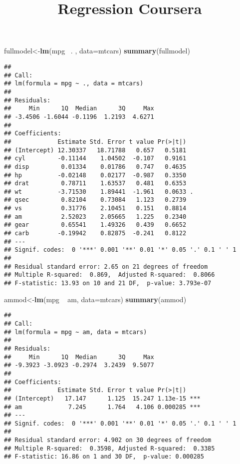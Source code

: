\documentclass[]{article}
\title{Regression Coursera}
\author{}
\date{}
\newenvironment{Shaded}{\begin{snugshade}}{\end{snugshade}}
\newcommand{\KeywordTok}[1]{\textcolor[rgb]{0.13,0.29,0.53}{\textbf{{#1}}}}
\newcommand{\DataTypeTok}[1]{\textcolor[rgb]{0.13,0.29,0.53}{{#1}}}
\newcommand{\StringTok}[1]{\textcolor[rgb]{0.31,0.60,0.02}{{#1}}}
\newcommand{\NormalTok}[1]{{#1}}
\begin{document}
\maketitle

\begin{Shaded}
\begin{Highlighting}[]
\NormalTok{fullmodel<-}\KeywordTok{lm}\NormalTok{(mpg~}\StringTok{ }\NormalTok{. , }\DataTypeTok{data=}\NormalTok{mtcars)}
\KeywordTok{summary}\NormalTok{(fullmodel)}
\end{Highlighting}
\end{Shaded}

\begin{verbatim}
## 
## Call:
## lm(formula = mpg ~ ., data = mtcars)
## 
## Residuals:
##     Min      1Q  Median      3Q     Max 
## -3.4506 -1.6044 -0.1196  1.2193  4.6271 
## 
## Coefficients:
##             Estimate Std. Error t value Pr(>|t|)  
## (Intercept) 12.30337   18.71788   0.657   0.5181  
## cyl         -0.11144    1.04502  -0.107   0.9161  
## disp         0.01334    0.01786   0.747   0.4635  
## hp          -0.02148    0.02177  -0.987   0.3350  
## drat         0.78711    1.63537   0.481   0.6353  
## wt          -3.71530    1.89441  -1.961   0.0633 .
## qsec         0.82104    0.73084   1.123   0.2739  
## vs           0.31776    2.10451   0.151   0.8814  
## am           2.52023    2.05665   1.225   0.2340  
## gear         0.65541    1.49326   0.439   0.6652  
## carb        -0.19942    0.82875  -0.241   0.8122  
## ---
## Signif. codes:  0 '***' 0.001 '**' 0.01 '*' 0.05 '.' 0.1 ' ' 1
## 
## Residual standard error: 2.65 on 21 degrees of freedom
## Multiple R-squared:  0.869,  Adjusted R-squared:  0.8066 
## F-statistic: 13.93 on 10 and 21 DF,  p-value: 3.793e-07
\end{verbatim}

\begin{Shaded}
\begin{Highlighting}[]
\NormalTok{ammod<-}\KeywordTok{lm}\NormalTok{(mpg ~}\StringTok{ }\NormalTok{am, }\DataTypeTok{data=}\NormalTok{mtcars)}
\KeywordTok{summary}\NormalTok{(ammod)}
\end{Highlighting}
\end{Shaded}

\begin{verbatim}
## 
## Call:
## lm(formula = mpg ~ am, data = mtcars)
## 
## Residuals:
##     Min      1Q  Median      3Q     Max 
## -9.3923 -3.0923 -0.2974  3.2439  9.5077 
## 
## Coefficients:
##             Estimate Std. Error t value Pr(>|t|)    
## (Intercept)   17.147      1.125  15.247 1.13e-15 ***
## am             7.245      1.764   4.106 0.000285 ***
## ---
## Signif. codes:  0 '***' 0.001 '**' 0.01 '*' 0.05 '.' 0.1 ' ' 1
## 
## Residual standard error: 4.902 on 30 degrees of freedom
## Multiple R-squared:  0.3598, Adjusted R-squared:  0.3385 
## F-statistic: 16.86 on 1 and 30 DF,  p-value: 0.000285
\end{verbatim}
\end{document}
